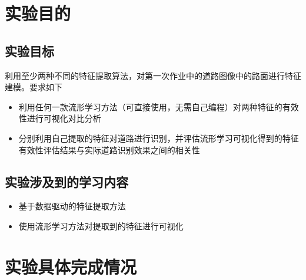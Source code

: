 \documentclass[12pt,hyperref,a4paper,UTF8]{ctexart}
\begin{document}
 
\cover

%
%

\thispagestyle{empty} %

\newpage
\tableofcontents

\newpage
\thispagestyle{secondpage}
\section{实验目的}
\subsection{实验目标}
	利用至少两种不同的特征提取算法，对第一次作业中的道路图像中的路面进行特征建模。要求如下
\begin{itemize}	
	\item 利用任何一款流形学习方法（可直接使用，无需自己编程）对两种特征的有效性进行可视化对比分析
	\item 分别利用自己提取的特征对道路进行识别，并评估流形学习可视化得到的特征有效性评估结果与实际道路识别效果之间的相关性
	
\end{itemize}
\subsection{实验涉及到的学习内容}
\begin{itemize}
	\item 基于数据驱动的特征提取方法
    \item 使用流形学习方法对提取到的特征进行可视化
\end{itemize}

\section{实验具体完成情况}
\end{document}
